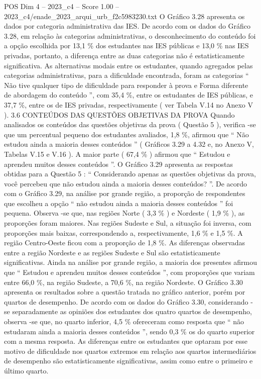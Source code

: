 \begin{textsample}{POS Dim 4 – 2023\_c4 – Score 1.00 – 2023\_c4/enade\_2023\_arqui\_urb\_f2c5983230.txt}
O Gráfico 3.28 apresenta os dados por categoria administrativa das IES.
De acordo com os dados do Gráfico 3.28, em relação às categorias administrativas, o desconhecimento do conteúdo foi a opção escolhida por 13,1 \% dos estudantes nas IES públicas e 13,0 \% nas IES privadas, portanto, a diferença entre as duas categorias não é estatisticamente significativa.
As alternativas modais entre os estudantes, quando agregados pelas categorias administrativas, para a dificuldade encontrada, foram as categorias “ Não tive qualquer tipo de dificuldade para responder à prova e Forma diferente de abordagem do conteúdo ”, com 35,4 \%, entre os estudantes de IES públicas, e 37,7 \%, entre os de IES privadas, respectivamente ( ver Tabela V.14 no Anexo V ). 3.6 CONTEÚDOS DAS QUESTÕES OBJETIVAS DA PROVA Quando analisados os conteúdos das questões objetivas da prova ( Questão 5 ), verifica -se que um percentual pequeno dos estudantes avaliados, 1,8 \%, afirmou que “ Não estudou ainda a maioria desses conteúdos ” ( Gráficos 3.29 a 4.32 e, no Anexo V, Tabelas V.15 e V.16 ).
A maior parte ( 67,4 \% ) afirmou que “ Estudou e aprendeu muitos desses conteúdos ”.
O Gráfico 3.29 apresenta as respostas obtidas para a Questão 5 : “ Considerando apenas as questões objetivas da prova, você percebeu que não estudou ainda a maioria desses conteúdos? ”.
De acordo com o Gráfico 3.29, na análise por grande região, a proporção de respondentes que escolheu a opção “ não estudou ainda a maioria desses conteúdos ” foi pequena.
Observa -se que, nas regiões Norte ( 3,3 \% ) e Nordeste ( 1,9 \% ), as proporções foram maiores.
Nas regiões Sudeste e Sul, a situação foi inversa, com proporções mais baixas, correspondendo a, respectivamente, 1,6 \% e 1,5 \%.
A região Centro-Oeste ficou com a proporção de 1,8 \%.
As diferenças observadas entre a região Nordeste e as regiões Sudeste e Sul são estatisticamente significativas.
Ainda na análise por grande região, a maioria dos presentes afirmou que “ Estudou e aprendeu muitos desses conteúdos ”, com proporções que variam entre 66,0 \%, na região Sudeste, a 70,6 \%, na região Nordeste.
O Gráfico 3.30 apresenta os resultados sobre a questão tratada no gráfico anterior, porém por quartos de desempenho.
De acordo com os dados do Gráfico 3.30, considerando -se separadamente as opiniões dos estudantes dos quatro quartos de desempenho, observa -se que, no quarto inferior, 4,5 \% ofereceram como resposta que “ não estudaram ainda a maioria desses conteúdos ”, sendo 0,3 \% os do quarto superior com a mesma resposta.
As diferenças entre os estudantes que optaram por esse motivo de dificuldade nos quartos extremos em relação aos quartos intermediários de desempenho são estatisticamente significativas, assim como entre o primeiro e último quarto.

\end{textsample}
